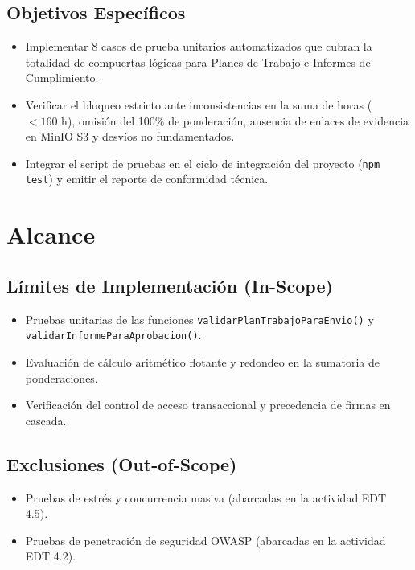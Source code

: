 \documentclass[12pt,a4paper]{article}
\begin{document}
\subsection{Objetivos Específicos}
\begin{itemize}[leftmargin=1.5em, itemsep=1.5pt]
    \item Implementar 8 casos de prueba unitarios automatizados que cubran la totalidad de compuertas lógicas para Planes de Trabajo e Informes de Cumplimiento.
    \item Verificar el bloqueo estricto ante inconsistencias en la suma de horas ($< 160\text{ h}$), omisión del 100\% de ponderación, ausencia de enlaces de evidencia en MinIO S3 y desvíos no fundamentados.
    \item Integrar el script de pruebas en el ciclo de integración del proyecto (\texttt{npm test}) y emitir el reporte de conformidad técnica.
\end{itemize}

\section{Alcance}

\subsection{Límites de Implementación (In-Scope)}
\begin{itemize}[leftmargin=1.5em, itemsep=1.5pt]
    \item Pruebas unitarias de las funciones \texttt{validarPlanTrabajoParaEnvio()} y \texttt{validarInformeParaAprobacion()}.
    \item Evaluación de cálculo aritmético flotante y redondeo en la sumatoria de ponderaciones.
    \item Verificación del control de acceso transaccional y precedencia de firmas en cascada.
\end{itemize}

\subsection{Exclusiones (Out-of-Scope)}
\begin{itemize}[leftmargin=1.5em, itemsep=1.5pt]
    \item Pruebas de estrés y concurrencia masiva (abarcadas en la actividad EDT 4.5).
    \item Pruebas de penetración de seguridad OWASP (abarcadas en la actividad EDT 4.2).
\end{itemize}
\end{document}
